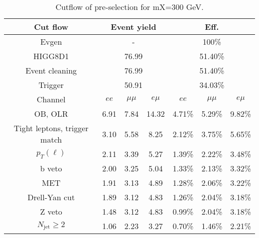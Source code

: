 \begin{table}
\centering\small
\begin{tabular}{c|ccc|ccc}
\hline
\hline
Cut flow &\multicolumn{3}{c|}{Event yield}&\multicolumn{3}{c}{Eff.}      \\
\hline
Evgen&\multicolumn{3}{c|}{-}&\multicolumn{3}{c}{100\%}\\
HIGG8D1&\multicolumn{3}{c|}{76.99}&\multicolumn{3}{c}{51.40\%}\\
Event cleaning&\multicolumn{3}{c|}{76.99}&\multicolumn{3}{c}{51.40\%}\\
Trigger&\multicolumn{3}{c|}{50.91    }&\multicolumn{3}{c}{34.03\%}\\
Channel&$ee$&$\mu\mu$&$e\mu$&$ee$&$\mu\mu$&$e\mu$\\
\hline
OB, OLR    &6.91    &7.84    &14.32& 4.71\%    &5.29\%    &9.82\%\\
Tight leptons, trigger match    &3.10    &5.58    &8.25    &2.12\%    &3.75\%    &5.65\%\\
$p_T(\ell)$    &2.11    &3.39    &5.27    &1.39\%    &2.22\%    &3.48\%\\
b veto    &2.00    &3.25    &5.04    &1.33\%    &2.13\%    &3.32\%\\
MET    &1.91    &3.13    &4.89    &1.28\%    &2.06\%    &3.22\%\\
Drell-Yan cut    &1.89    &3.12    &4.83    &1.26\%    &2.04\%    &3.18\%\\
Z veto    &1.48    &3.12    &4.83    &0.99\%    &2.04\%    &3.18\%\\
$N_{\text{jet}}\geq2$    &1.06    &2.23    &3.27    &0.70\%    &1.46\%    &2.21\%\\
\hline
\hline
\end{tabular}
\caption{Cutflow of pre-selection for mX=300 GeV.}
\label{tab:cut_flow_preselection_mX300}
\end{table}
